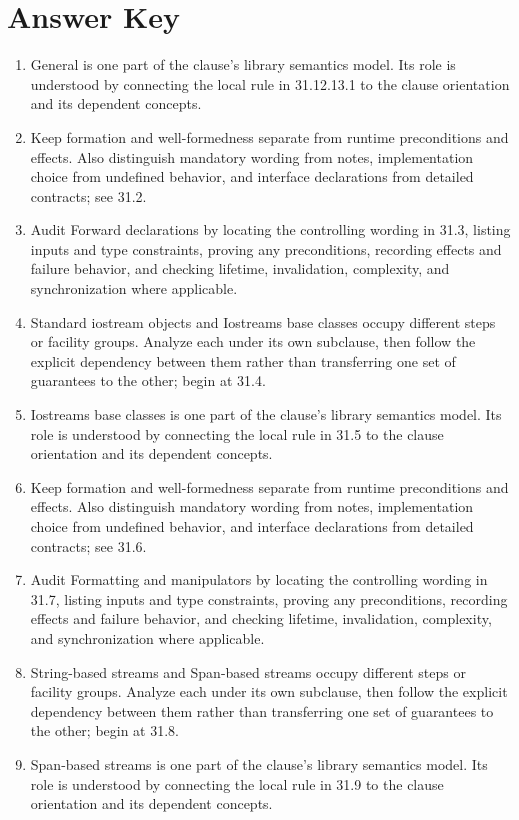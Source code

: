 \documentclass[11pt,letterpaper]{article}
\begin{document}
\clearpage\section{Answer Key}
\begin{enumerate}
\item General is one part of the clause's library semantics model. Its role is understood by connecting the local rule in 31.12.13.1 to the clause orientation and its dependent concepts.
\item Keep formation and well-formedness separate from runtime preconditions and effects. Also distinguish mandatory wording from notes, implementation choice from undefined behavior, and interface declarations from detailed contracts; see 31.2.
\item Audit Forward declarations by locating the controlling wording in 31.3, listing inputs and type constraints, proving any preconditions, recording effects and failure behavior, and checking lifetime, invalidation, complexity, and synchronization where applicable.
\item Standard iostream objects and Iostreams base classes occupy different steps or facility groups. Analyze each under its own subclause, then follow the explicit dependency between them rather than transferring one set of guarantees to the other; begin at 31.4.
\item Iostreams base classes is one part of the clause's library semantics model. Its role is understood by connecting the local rule in 31.5 to the clause orientation and its dependent concepts.
\item Keep formation and well-formedness separate from runtime preconditions and effects. Also distinguish mandatory wording from notes, implementation choice from undefined behavior, and interface declarations from detailed contracts; see 31.6.
\item Audit Formatting and manipulators by locating the controlling wording in 31.7, listing inputs and type constraints, proving any preconditions, recording effects and failure behavior, and checking lifetime, invalidation, complexity, and synchronization where applicable.
\item String-based streams and Span-based streams occupy different steps or facility groups. Analyze each under its own subclause, then follow the explicit dependency between them rather than transferring one set of guarantees to the other; begin at 31.8.
\item Span-based streams is one part of the clause's library semantics model. Its role is understood by connecting the local rule in 31.9 to the clause orientation and its dependent concepts.

\end{enumerate}
\end{document}
